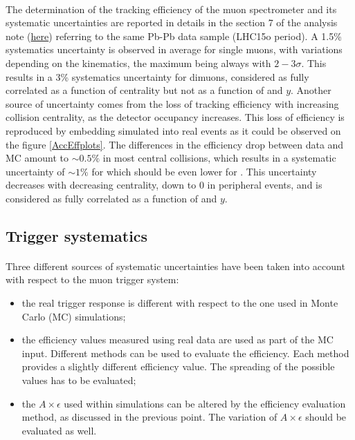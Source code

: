 \paragraph{}
The determination of the tracking efficiency of the muon spectrometer and its systematic uncertainties are reported in details in the section 7 of the \jpsi analysis note (\href{https://aliceinfo.cern.ch/Notes/node/486}{here}) referring to the same Pb-Pb data sample (LHC15o period).
A 1.5\% systematics uncertainty is observed in average for single muons, with variations depending on the kinematics, the maximum being always with $2-3\sigma$.
This results in a 3\% systematics uncertainty for dimuons, considered as fully correlated as a function of centrality but not as a function of \pt and $y$.
Another source of uncertainty comes from the loss of tracking efficiency with increasing collision centrality, as the detector occupancy increases. 
This loss of efficiency is reproduced by embedding simulated \ups into real events as it could be observed on the figure \ref{AccEffplots}.
The differences in the efficiency drop between data and MC amount to $\sim0.5\%$ in most central collisions,
which results in a systematic uncertainty of $\sim1\%$ for \jpsi which should be even lower for \ups.
This uncertainty decreases with decreasing centrality, down to 0 in peripheral events, and is considered as fully correlated as a function of \pt and $y$.







\subsection{\label{systTrigger}Trigger systematics}

\paragraph{}
Three different sources of systematic uncertainties have been taken into account with respect to the muon trigger system:

\begin{itemize}
  \item the real trigger response is different with respect to the one used in Monte Carlo (MC) simulations;
  \item the efficiency values measured using real data are used as part of the MC input. Different methods can be used to evaluate the efficiency. Each method provides a slightly different efficiency value. The spreading of the possible values has to be evaluated;
  \item the $A\times\epsilon$ used within simulations can be altered by the efficiency evaluation method, as discussed in the previous point. The variation of $A\times\epsilon$ should be evaluated as well.
\end{itemize}

